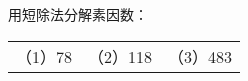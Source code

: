 
用短除法分解素因数：\\
\begin{tabular}{ccc}
（1）78\hspace{12em} & （2）118\hspace{12em} & （3）483\hspace{12em}\\[12em]
\end{tabular}
